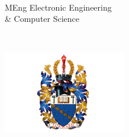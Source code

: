 %
%
%
\begin{titlepage}
  \begin{center}
    \vspace*{1cm}

    \Huge
    \textbf{\@title}\\
    \vspace{0.5cm}
    \LARGE
    \subtitle{}

    \Large
    \vspace{3cm}
    MEng Electronic Engineering\\
    \& Computer Science

    \vspace{2cm}
    \@author\\
    \@date

    \vfill

    \includegraphics[width=0.4\textwidth]{assets/aston.jpeg}

    \vspace{1cm}
    \institution{}\\
  \end{center}
\end{titlepage}
